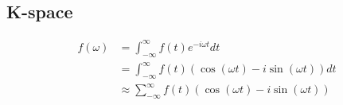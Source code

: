 \subsection{K-space}




\begin{displaymath}
  \begin{array}{rl}
    f(\omega) &= \int^\infty_{-\infty}f(t)e^{-i \omega t} dt \\
    &= \int^\infty_{-\infty}f(t)(\cos(\omega t) - i \sin(\omega t)) dt \\
    &\approx \sum^\infty_{-\infty}f(t)(\cos(\omega t) - i \sin(\omega t))
  \end{array}
\end{displaymath}




